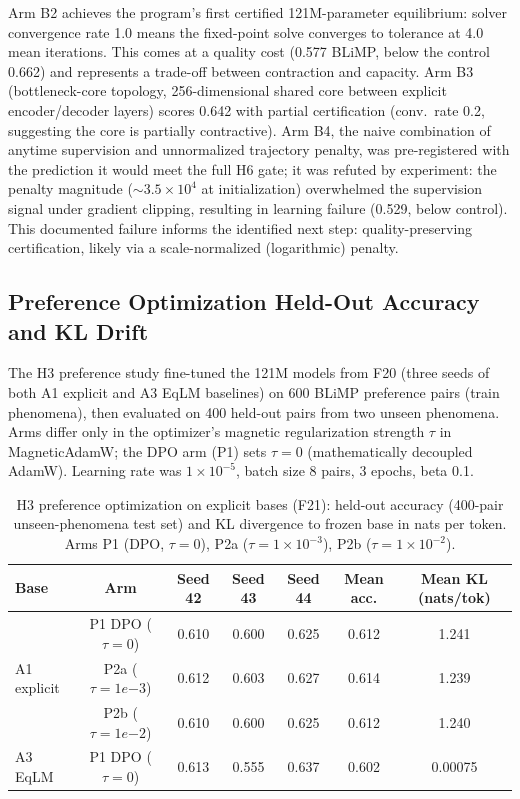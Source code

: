 Arm B2 achieves the program's first certified 121M-parameter equilibrium: solver convergence rate 1.0 means the fixed-point solve converges to tolerance at 4.0 mean iterations. This comes at a quality cost (0.577 BLiMP, below the control 0.662) and represents a trade-off between contraction and capacity. Arm B3 (bottleneck-core topology, 256-dimensional shared core between explicit encoder/decoder layers) scores 0.642 with partial certification (conv.\ rate 0.2, suggesting the core is partially contractive). Arm B4, the naive combination of anytime supervision and unnormalized trajectory penalty, was pre-registered with the prediction it would meet the full H6 gate; it was refuted by experiment: the penalty magnitude ($\sim 3.5 \times 10^4$ at initialization) overwhelmed the supervision signal under gradient clipping, resulting in learning failure (0.529, below control). This documented failure informs the identified next step: quality-preserving certification, likely via a scale-normalized (logarithmic) penalty.

\subsection{Preference Optimization Held-Out Accuracy and KL Drift}

The H3 preference study fine-tuned the 121M models from F20 (three seeds of both A1 explicit and A3 EqLM baselines) on 600 BLiMP preference pairs (train phenomena), then evaluated on 400 held-out pairs from two unseen phenomena. Arms differ only in the optimizer's magnetic regularization strength $\tau$ in MagneticAdamW; the DPO arm (P1) sets $\tau = 0$ (mathematically decoupled AdamW). Learning rate was $1 \times 10^{-5}$, batch size 8 pairs, 3 epochs, beta 0.1.

\begin{table}[h]
\centering
\small
\caption{H3 preference optimization on explicit bases (F21): held-out accuracy (400-pair unseen-phenomena test set) and KL divergence to frozen base in nats per token. Arms P1 (DPO, $\tau=0$), P2a ($\tau=1 \times 10^{-3}$), P2b ($\tau=1 \times 10^{-2}$).}
\label{tab:preference_explicit}
\begin{tabular}{@{}lcccccc@{}}
\toprule
Base & Arm & Seed 42 & Seed 43 & Seed 44 & Mean acc. & Mean KL (nats/tok) \\
\midrule
\multirow{3}{*}{A1 explicit} & P1 DPO ($\tau=0$) & 0.610 & 0.600 & 0.625 & 0.612 & 1.241 \\
 & P2a ($\tau=1e{-3}$) & 0.612 & 0.603 & 0.627 & 0.614 & 1.239 \\
 & P2b ($\tau=1e{-2}$) & 0.610 & 0.600 & 0.625 & 0.612 & 1.240 \\
\midrule
\multirow{1}{*}{A3 EqLM} & P1 DPO ($\tau=0$) & 0.613 & 0.555 & 0.637 & 0.602 & 0.00075 \\
\bottomrule
\end{tabular}
\end{table}

